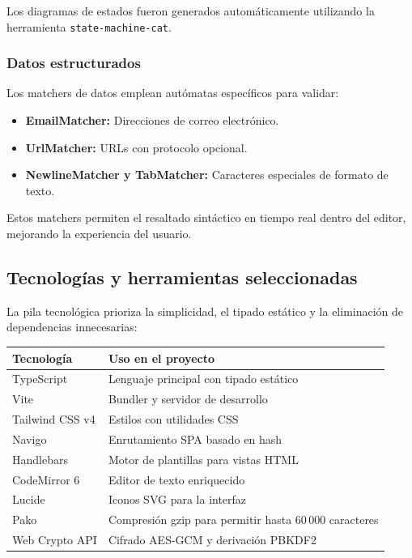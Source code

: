 \documentclass[12pt,letterpaper]{article}
\begin{document}
Los diagramas de estados fueron generados automáticamente utilizando la herramienta \texttt{state-machine-cat}.




\subsubsection{Datos estructurados}
Los matchers de datos emplean autómatas específicos para validar:

\begin{itemize}
    \item \textbf{EmailMatcher:} Direcciones de correo electrónico.
    \item \textbf{UrlMatcher:} URLs con protocolo opcional.
    \item \textbf{NewlineMatcher y TabMatcher:} Caracteres especiales de formato de texto.
\end{itemize}

Estos matchers permiten el resaltado sintáctico en tiempo real dentro del editor, mejorando la experiencia del usuario.

\subsection{Tecnologías y herramientas seleccionadas}
La pila tecnológica prioriza la simplicidad, el tipado estático y la eliminación de dependencias innecesarias:

\begin{table}[H]
    \centering
    \begin{tabularx}{\textwidth}{p{3cm}X}
        \toprule
        \textbf{Tecnología} & \textbf{Uso en el proyecto} \\
        \midrule
        TypeScript & Lenguaje principal con tipado estático \\
        Vite & Bundler y servidor de desarrollo \\
        Tailwind CSS v4 & Estilos con utilidades CSS \\
        Navigo & Enrutamiento SPA basado en hash \\
        Handlebars & Motor de plantillas para vistas HTML \\
        CodeMirror 6 & Editor de texto enriquecido \\
        Lucide & Iconos SVG para la interfaz \\
        Pako & Compresión gzip para permitir hasta 60\,000 caracteres \\
        Web Crypto API & Cifrado AES-GCM y derivación PBKDF2 \\
        \bottomrule
    \end{tabularx}
\end{table}
\end{document}
